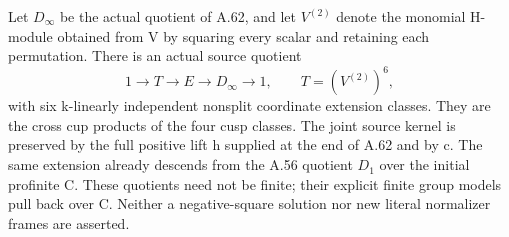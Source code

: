 Let \(D_\infty\) be the actual quotient of A.62, and let
\(V^{(2)}\) denote the monomial H-module obtained from V
by squaring every scalar and retaining each permutation.
There is an actual source quotient
\[
 1\longrightarrow T\longrightarrow E\longrightarrow D_\infty
 \longrightarrow1,\qquad T=(V^{(2)})^6,
 \tag{A.63.1}
\]
with six k-linearly independent nonsplit coordinate extension
classes. They are the cross cup products of the four cusp
classes. The joint source kernel is preserved by the full
positive lift h supplied at the end of A.62 and by c.
The same extension already descends from the A.56 quotient
\(D_1\) over the initial profinite C. These quotients need
not be finite; their explicit finite group models pull back
over C. Neither a negative-square solution nor new literal
normalizer frames are asserted.

